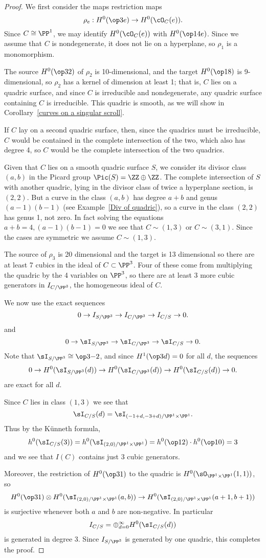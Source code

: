 \begin{proof}
We first consider the maps restriction maps
$$
\rho_e: H^0(\op3e)\to H^0(\cO_C(e)).
$$
Since $C\cong \PP^1$,
we may identify $H^0(\cO_C(e))$ with $H^0(\op1{4e})$.
 Since we assume that $C$ is nondegenerate, it does not lie on a hyperplane,
 so  $\rho_1$ is a monomorphism. 
 
The source $H^0(\op32)$ of $\rho_2$ is 10-dimensional, and the target $H^0(\op18)$ is
9-dimensional, so $\rho_2$ has a kernel of dimension at least 1; that is, $C$ lies on
a quadric surface, and since $C$ is irreducible and nondegenerate, any quadric surface containing
$C$ is irreducible. This quadric is smooth, as we will show in Corollary~\ref{curves on a singular scroll}.

If $C$ lay on a second quadric surface, then, since the quadrics must be irreducible,
$C$ would be contained in the complete intersection of the two, which also has degree 4, so 
$C$ would be the complete intersection of the two quadrics.

Given that $C$ lies on a smooth quadric surface $S$, we consider its divisor class $(a,b)$ in the 
Picard group $\Pic(S) = \ZZ\oplus \ZZ$. The complete intersection of $S$ with another
quadric, lying in the divisor class of twice a hyperplane section, is $(2,2)$. But a curve
in the class $(a,b)$ has degree $a+b$ and genus $(a-1)(b-1)$ (see Example~\ref{Div of quadric}), so a curve in the class $(2,2)$
has genus 1, not zero. In fact solving the equations $a+b=4, (a-1)(b-1)=0$ we see that $C\sim (1,3)$ or $C\sim (3,1)$. Since the cases
are symmetric we assume $C\sim(1,3)$. 

The source of $\rho_3$ is 20 dimensional and the target is 13 dimensional so there are at least 7
cubics in the ideal of $C\subset \PP^3$. Four of these come from multiplying the quadric
by the 4 variables on $\PP^3$, so there are at least 3 more cubic generators in $I_{C/\PP^3}$,
 the homogeneous ideal of $C$. 

We now use the exact sequences 
$$
0\to I_{S/\PP^3} \to I_{C/\PP^3} \to I_{C/S} \to 0.
$$
and
$$
0\to \sI_{S/\PP^3} \to \sI_{C/\PP^3} \to \sI_{C/S} \to 0.
$$
Note that $\sI_{S/\PP^3} \cong \op3{-2}$, and since $H^1(\op3d)=0$ for all $d$, 
the sequences
$$
0\to H^0(\sI_{S/\PP^3}(d)) \to H^0(\sI_{C/\PP^3}(d)) \to H^0(\sI_{C/S}(d)) \to 0.
$$
are exact for all $d$. 

Since $C$ lies in class $(1,3)$ we see that 
$$
\sI_{C/S}(d) = \sI_{(-1+d,-3+d)/\PP^1\times \PP^1}.
$$
Thus by the K\"unneth formula,
$$
h^0(\sI_{C/S}(3)) = h^0(\sI_{(2,0)/\PP^1\times \PP^1}) = h^0(\op12)\cdot h^0(\op10) = 3
$$
and we see that $I(C)$ contains just 3 cubic generators. 

Moreover, the restriction
of $H^0(\op31)$ to the quadric is $H^0(\sO_{\PP^1\times \PP^1}(1,1))$,
so 
$$
H^0(\op31) \otimes H^0(\sI_{(2,0)/\PP^1\times \PP^1}(a,b)) \to 
H^0(\sI_{(2,0)/\PP^1\times \PP^1}(a+1, b+1))
$$
is surjective whenever both $a$ and $b$ are non-negative. In particular
$$
I_{C/S} = \oplus_{d=0}^\infty H^0(\sI_{C/S}(d))
$$
 is generated in degree 3. Since $I_{S/\PP^3}$ is generated by one quadric, this
  completes the proof.
\end{proof}

